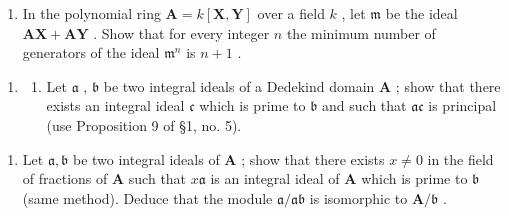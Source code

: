 \begin{enumerate}
\def\labelenumi{(\alph{enumi})}
\setcounter{enumi}{1}
\tightlist
\item
  In the polynomial ring \(\mathbf{A} = k[\mathbf{X},\mathbf{Y}]\) over a field \(k\) , let \(\mathfrak{m}\) be the ideal \(\mathbf{AX} + \mathbf{AY}\) . Show that for every integer \(n\) the minimum number of generators of the ideal \(\mathfrak{m}^n\) is \(n + 1\) .
\end{enumerate}

\begin{enumerate}
\def\labelenumi{\arabic{enumi}.}
\setcounter{enumi}{1}
\tightlist
\item
  \begin{enumerate}
  \def\labelenumii{(\alph{enumii})}
  \tightlist
  \item
    Let \(\mathfrak{a}\) , \(\mathfrak{b}\) be two integral ideals of a Dedekind domain \(\mathbf{A}\) ; show that there exists an integral ideal \(\mathfrak{c}\) which is prime to \(\mathfrak{b}\) and such that \(\mathfrak{ac}\) is principal (use Proposition 9 of §1, no. 5).
  \end{enumerate}
\end{enumerate}

\begin{enumerate}
\def\labelenumi{(\alph{enumi})}
\setcounter{enumi}{1}
\tightlist
\item
  Let \(\mathfrak{a}, \mathfrak{b}\) be two integral ideals of \(\mathbf{A}\) ; show that there exists \(x \neq 0\) in the field of fractions of \(\mathbf{A}\) such that \(x\mathfrak{a}\) is an integral ideal of \(\mathbf{A}\) which is prime to \(\mathfrak{b}\) (same method). Deduce that the module \(\mathfrak{a}/\mathfrak{ab}\) is isomorphic to \(\mathbf{A}/\mathfrak{b}\) .
\end{enumerate}

